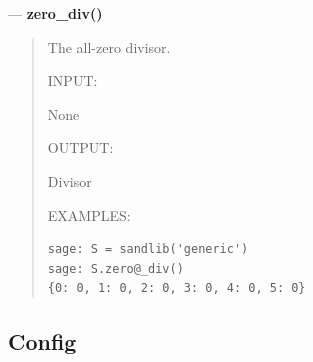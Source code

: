 \documentclass[letterpaper,10pt,english]{manual}
\begin{document}
---
\hypertarget{zero-div}{}
\textbf{zero\_div()}
\begin{quote}

The all-zero divisor.

INPUT:

None

OUTPUT:

Divisor

EXAMPLES:

\begin{Verbatim}[commandchars=@\[\]]
sage: S = sandlib('generic')
sage: S.zero@_div()
{0: 0, 1: 0, 2: 0, 3: 0, 4: 0, 5: 0}
\end{Verbatim}
\end{quote}


\subsection{Config}
\end{document}
